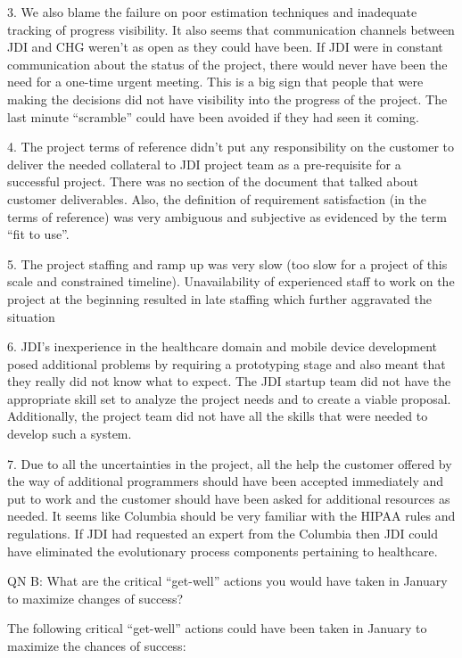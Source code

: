 \documentclass[11pt]{article}
\begin{document}
3. We also blame the failure on poor estimation techniques and inadequate tracking of progress
visibility. It also seems that communication channels between JDI and CHG weren't as open as they
could have been. If JDI were in constant communication about the status of the project, there would
never have been the need for a one-time urgent meeting. This is a big sign that people that were
making the decisions did not have visibility into the progress of the project. The last minute
“scramble” could have been avoided if they had seen it coming.

4. The project terms of reference didn’t put any responsibility on the customer to deliver the
needed collateral to JDI project team as a pre-requisite for a successful project. There was no
section of the document that talked about customer deliverables. Also, the definition of requirement
satisfaction (in the terms of reference) was very ambiguous and subjective as evidenced by the term
“fit to use”.

5. The project staffing and ramp up was very slow (too slow for a project of this scale and
constrained timeline). Unavailability of experienced staff to work on the project at the beginning
resulted in late staffing which further aggravated the situation

6. JDI’s inexperience in the healthcare domain and mobile device development posed additional
problems by requiring a prototyping stage and also meant that they really did not know what to
expect. The JDI startup team did not have the appropriate skill set to analyze the project needs and
to create a viable proposal. Additionally, the project team did not have all the skills that were
needed to develop such a system.

7. Due to all the uncertainties in the project, all the help the customer offered by the way of
additional programmers should have been accepted immediately and put to work and the customer should
have been asked for additional resources as needed. It seems like Columbia should be very familiar
with the HIPAA rules and regulations. If JDI had requested an expert from the Columbia then JDI
could have eliminated the evolutionary process components pertaining to healthcare.

QN B: What are the critical “get-well” actions you would have taken in January to maximize changes
of success?

The following critical “get-well” actions could have been taken in January to maximize the chances
of success:
\end{document}
